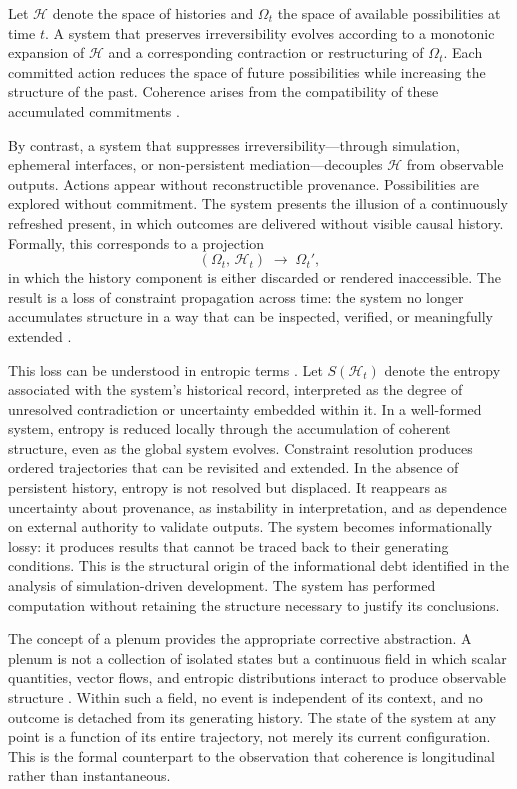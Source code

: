 \documentclass[12pt, a4paper]{article}
\begin{document}
Let $\mathcal{H}$ denote the space of histories and $\Omega_t$ the space of available possibilities at time $t$. A system that preserves irreversibility evolves according to a monotonic expansion of $\mathcal{H}$ and a corresponding contraction or restructuring of $\Omega_t$. Each committed action reduces the space of future possibilities while increasing the structure of the past. Coherence arises from the compatibility of these accumulated commitments \cite{Wiener1948,Ashby1956}.

By contrast, a system that suppresses irreversibility---through simulation, ephemeral interfaces, or non-persistent mediation---decouples $\mathcal{H}$ from observable outputs. Actions appear without reconstructible provenance. Possibilities are explored without commitment. The system presents the illusion of a continuously refreshed present, in which outcomes are delivered without visible causal history. Formally, this corresponds to a projection
\[
(\Omega_t,\, \mathcal{H}_t) \;\longrightarrow\; \Omega_t',
\]
in which the history component is either discarded or rendered inaccessible. The result is a loss of constraint propagation across time: the system no longer accumulates structure in a way that can be inspected, verified, or meaningfully extended \cite{Landauer1961}.

This loss can be understood in entropic terms \cite{Jaynes1957,Shannon1948}. Let $S(\mathcal{H}_t)$ denote the entropy associated with the system's historical record, interpreted as the degree of unresolved contradiction or uncertainty embedded within it. In a well-formed system, entropy is reduced locally through the accumulation of coherent structure, even as the global system evolves. Constraint resolution produces ordered trajectories that can be revisited and extended. In the absence of persistent history, entropy is not resolved but displaced. It reappears as uncertainty about provenance, as instability in interpretation, and as dependence on external authority to validate outputs. The system becomes informationally lossy: it produces results that cannot be traced back to their generating conditions. This is the structural origin of the informational debt identified in the analysis of simulation-driven development. The system has performed computation without retaining the structure necessary to justify its conclusions.

The concept of a plenum provides the appropriate corrective abstraction. A plenum is not a collection of isolated states but a continuous field in which scalar quantities, vector flows, and entropic distributions interact to produce observable structure \cite{Feynman1963,Barandes2023}. Within such a field, no event is independent of its context, and no outcome is detached from its generating history. The state of the system at any point is a function of its entire trajectory, not merely its current configuration. This is the formal counterpart to the observation that coherence is longitudinal rather than instantaneous.
\end{document}

